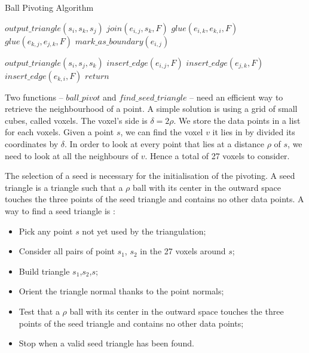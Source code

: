 \documentclass[12pt]{article}
\begin{document}
\begin{algorithm}
\caption{Ball Pivoting Algorithm}
\label{alg:bpa}
\begin{algorithmic}[5]
      \State $output\_triangle(s_i, s_k, s_j)$
      \State $join(e_{i,j}, s_k, F)$
        \State $glue(e_{i,k}, e_{k,i}, F)$
      \EndIf
        \State $glue(e_{k,j}, e_{j,k}, F)$
      \EndIf
    \Else
      \State $mark\_as\_boundary(e_{i,j})$
    \EndIf
  \EndWhile

    \State $output\_triangle(s_i, s_j, s_k)$
    \State $insert\_edge(e_{i,j}, F)$
    \State $insert\_edge(e_{j,k}, F)$
    \State $insert\_edge(e_{k,i}, F)$
  \Else
    \State $return$
  \EndIf
\EndWhile
\end{algorithmic}
\end{algorithm} 

Two functions -- $ball\_pivot$ and $find\_seed\_triangle$ -- need an efficient way to retrieve the neighbourhood of a point. A simple solution is using a grid of small cubes, called voxels. The voxel's side is $\delta = 2\rho$. We store the data points in a list for each voxels. Given a point $s$, we can find the voxel $v$ it lies in by divided its coordinates by $\delta$. In order to look at every point that lies at a distance $\rho$ of $s$, we need to look at all the neighbours of $v$. Hence a total of 27 voxels to consider.

The selection of a seed is necessary for the initialisation of the pivoting. A seed triangle is a triangle such that a $\rho$ ball with its center in the outward space touches the three points of the seed triangle and contains no other data points. A way to find a seed triangle is :
\begin{itemize}
\item Pick any point $s$ not yet used by the triangulation;
\item Consider all pairs of point $s_1$, $s_2$ in the 27 voxels around $s$;
\item Build triangle $s_1$,$s_2$,$s$;
\item Orient the triangle normal thanks to the point normals;
\item Test that a $\rho$ ball with its center in the outward space touches the three points of the seed triangle and contains no other data points;
\item Stop when a valid seed triangle has been found.
\end{itemize}
\end{document}
